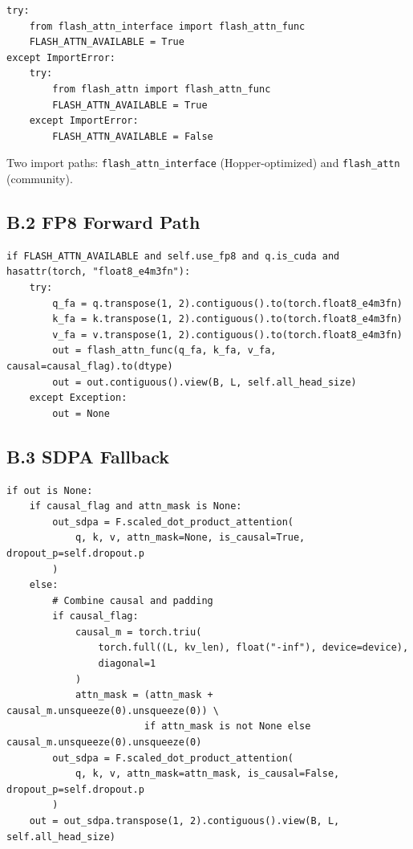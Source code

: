 \begin{lstlisting}
try:
    from flash_attn_interface import flash_attn_func
    FLASH_ATTN_AVAILABLE = True
except ImportError:
    try:
        from flash_attn import flash_attn_func
        FLASH_ATTN_AVAILABLE = True
    except ImportError:
        FLASH_ATTN_AVAILABLE = False
\end{lstlisting}

Two import paths: \texttt{flash\_attn\_interface} (Hopper-optimized) and \texttt{flash\_attn} 
(community).

\subsection{B.2 FP8 Forward Path}

\begin{lstlisting}
if FLASH_ATTN_AVAILABLE and self.use_fp8 and q.is_cuda and hasattr(torch, "float8_e4m3fn"):
    try:
        q_fa = q.transpose(1, 2).contiguous().to(torch.float8_e4m3fn)
        k_fa = k.transpose(1, 2).contiguous().to(torch.float8_e4m3fn)
        v_fa = v.transpose(1, 2).contiguous().to(torch.float8_e4m3fn)
        out = flash_attn_func(q_fa, k_fa, v_fa, causal=causal_flag).to(dtype)
        out = out.contiguous().view(B, L, self.all_head_size)
    except Exception:
        out = None
\end{lstlisting}

\subsection{B.3 SDPA Fallback}

\begin{lstlisting}
if out is None:
    if causal_flag and attn_mask is None:
        out_sdpa = F.scaled_dot_product_attention(
            q, k, v, attn_mask=None, is_causal=True, dropout_p=self.dropout.p
        )
    else:
        # Combine causal and padding
        if causal_flag:
            causal_m = torch.triu(
                torch.full((L, kv_len), float("-inf"), device=device),
                diagonal=1
            )
            attn_mask = (attn_mask + causal_m.unsqueeze(0).unsqueeze(0)) \
                        if attn_mask is not None else causal_m.unsqueeze(0).unsqueeze(0)
        out_sdpa = F.scaled_dot_product_attention(
            q, k, v, attn_mask=attn_mask, is_causal=False, dropout_p=self.dropout.p
        )
    out = out_sdpa.transpose(1, 2).contiguous().view(B, L, self.all_head_size)
\end{lstlisting}

